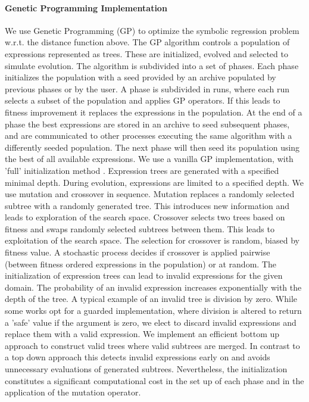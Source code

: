 \paragraph{Genetic Programming Implementation}
We use Genetic Programming (GP) \cite{GP} to optimize the symbolic regression problem w.r.t. the distance function above. The GP algorithm controls a population of expressions represented as trees. These are initialized, evolved and selected to simulate evolution.
The algorithm is subdivided into a set of phases. Each phase initializes the population with a seed provided by an archive populated by previous phases or by the user. A phase is subdivided in runs, where each run selects a subset of the population and applies GP operators. If this leads to fitness improvement it replaces the expressions in the population. At the end of a phase the best expressions are stored in an archive to seed subsequent phases, and are communicated to other processes executing the same algorithm with a differently seeded population. The next phase will then seed its population using the best of all available expressions.
We use a vanilla GP implementation, with 'full' initialization method \cite{GP}. Expression trees are generated with a specified minimal depth. During evolution, expressions are limited to a specified depth. We use mutation and crossover in sequence. Mutation replaces a randomly selected subtree with a randomly generated tree. This introduces new information and leads to exploration of the search space. Crossover selects two trees based on fitness and swaps randomly selected subtrees between them. This leads to exploitation of the search space. The selection for crossover is random, biased by fitness value. A stochastic process decides if crossover is applied pairwise (between fitness ordered expressions in the population) or at random.
The initialization of expression trees can lead to invalid expressions for the given domain. The probability of an invalid expression increases exponentially with the depth of the tree. A typical example of an invalid tree is division by zero. While some works opt for a guarded implementation, where division is altered to return a 'safe' value if the argument is zero, we elect to discard invalid expressions and replace them with a valid expression. We implement an efficient bottom up approach to construct valid trees where valid subtrees are merged. In contrast to a top down approach this detects invalid expressions early on and avoids unnecessary evaluations of generated subtrees. Nevertheless, the initialization constitutes a significant computational cost in the set up of each phase and in the application of the mutation operator.